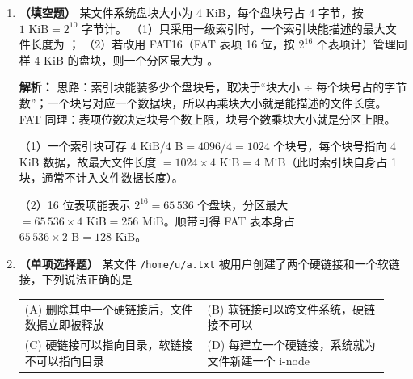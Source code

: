 \begin{enumerate}
\ifshowsolutions\par\noindent\textbf{解析：} SCAN 像电梯一样来回扫描，两端柱面刚被扫过就要等磁头走完一个来回，等待时间反而比中间柱面长，故 (A) 说反了。

C-SCAN 只在磁头前进方向服务，扫到端点后直接快速返回起点、返程不服务，于是每个柱面的等待时间接近“一个方向上的扫描周期”，分布更均匀，(B) 正确。

(C) 错：返程那一段移动量 C-SCAN 也要花时间（有的实现还把它计入寻道），总寻道长度常常更大，本题问的是“一定小于”，不成立。(D) 错：LOOK 的特点恰恰是看到该方向上没有更远的请求就折返，不必到达物理端点。\else \answerarea \fi

\vspace{8pt}

\item \textbf{（填空题）} 某文件系统盘块大小为 4 KiB，每个盘块号占 4 字节，按 $1\text{ KiB}=2^{10}$ 字节计。
（1）只采用一级索引时，一个索引块能描述的最大文件长度为 \underline{\hspace{2.4cm}}；
（2）若改用 FAT16（FAT 表项 16 位，按 $2^{16}$ 个表项计）管理同样 4 KiB 的盘块，则一个分区最大为 \underline{\hspace{2.4cm}}。

\ifshowsolutions\par\noindent\textbf{解析：} 思路：索引块能装多少个盘块号，取决于“块大小 $\div$ 每个块号占的字节数”；一个块号对应一个数据块，所以再乘块大小就是能描述的文件长度。FAT 同理：表项位数决定块号个数上限，块号个数乘块大小就是分区上限。

（1）一个索引块可存 $4\text{ KiB}/4\text{ B}=4096/4=1024$ 个块号，每个块号指向 4 KiB 数据，故最大文件长度 $=1024\times 4\text{ KiB}=4\text{ MiB}$（此时索引块自身占 1 块，通常不计入文件数据长度）。

（2）16 位表项能表示 $2^{16}=65\,536$ 个盘块，分区最大 $=65\,536\times 4\text{ KiB}=256\text{ MiB}$。顺带可得 FAT 表本身占 $65\,536\times 2\text{ B}=128\text{ KiB}$。

\else \answerarea[5] \fi

\vspace{8pt}

\item \textbf{（单项选择题）} 某文件 \texttt{/home/u/a.txt} 被用户创建了两个硬链接和一个软链接，下列说法正确的是
\begin{center}
\begin{tabular}{p{0.47\linewidth}p{0.47\linewidth}}
(A) 删除其中一个硬链接后，文件数据立即被释放 & (B) 软链接可以跨文件系统，硬链接不可以 \\[4pt]
(C) 硬链接可以指向目录，软链接不可以指向目录 & (D) 每建立一个硬链接，系统就为文件新建一个 i-node
\end{tabular}
\end{center}


\end{enumerate}
